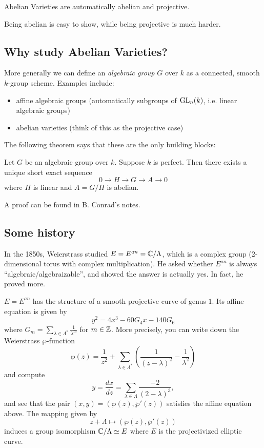 \begin{theorem}
Abelian Varieties are automatically abelian and projective.
\end{theorem}

Being abelian is easy to show, while being projective is much harder.

\subsection{Why study Abelian Varieties?}

More generally we can define an \emph{algebraic group} $G$ over $k$ as a connected, smooth $k$-group scheme. Examples include:
\begin{itemize}
\item affine algebraic groups (automatically subgroups of $\operatorname{GL}_n(k)$, i.e. linear algebraic groups)
\item abelian varieties (think of this as the projective case)
\end{itemize}

The following theorem says that these are the only building blocks:

\begin{theorem}
Let $G$ be an algebraic group over $k$. Suppose $k$ is perfect. Then there exists a unique short exact sequence 
$$0\to H \to G \to A \to 0$$
where $H$ is linear and $A=G/H$ is abelian. 
\end{theorem}

A proof can be found in B. Conrad's notes. 

\subsection{Some history}
In the 1850s, Weierstrass studied $E=E^{an}={\mathbb C}/\Lambda$, which is a complex group (2-dimensional torus with complex multiplication). He asked whether $E^{an}$ is always ``algebraic/algebraizable'', and showed the answer is actually yes. In fact, he proved more. 

\begin{theorem}
$E=E^{an}$ has the structure of a smooth projective curve of genus $1$. Its affine equation is given by 
$$y^2=4x^3-60G_4x-140G_6$$
where $G_m=\sum_{\lambda\in\Lambda^*} \frac{1}{\lambda^m}$ for $m\in {\mathbb Z}$. More precisely, you can write down the Weierstrass $\wp$-function
$$\wp(z)=\frac{1}{z^2}+\sum_{\lambda\in\Lambda^*}\left(\frac{1}{(z-\lambda)^2}-\frac{1}{\lambda^2}\right)$$
and compute
$$y=\frac{dx}{dz}=\sum_{\lambda\in \Lambda} \frac{-2}{(2-\lambda)^3},$$
and see that the pair $(x,y)=(\wp(z),\wp'(z))$ satisfies the affine equation above. The mapping given by 
$$z+\Lambda\mapsto (\wp(z),\wp'(z))$$ induces a group isomorphism ${\mathbb C}/\Lambda\simeq E$ where $E$ is the projectivized elliptic curve.
\end{theorem}



